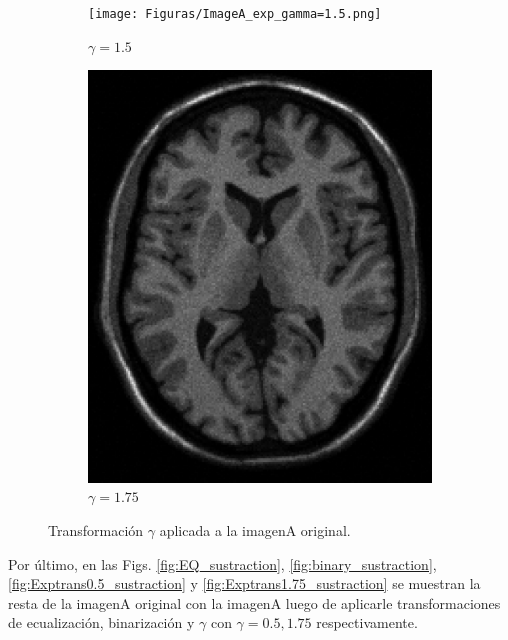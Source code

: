 \documentclass[11pt,twocolumn,twoside]{opticajnl}
\begin{document}
\begin{figure}[H]
         \begin{subfigure}[h]{0.32\linewidth}
            \centering
            \texttt{[image: Figuras/ImageA\_exp\_gamma=1.5.png]}
            \caption{$\gamma = 1.5$} 
         \end{subfigure}
         \begin{subfigure}[h]{0.32\linewidth}
            \centering
            \includegraphics[width=\textwidth]{Figuras/ImageA_exp_gamma=1.75.png}
            \caption{$\gamma = 1.75$} 
         \end{subfigure}
    \caption{Transformación $\gamma$ aplicada a la imagenA original.}
    \label{fig:Exptrans}
\end{figure}

Por último, en las Figs. \ref{fig:EQ_sustraction}, \ref{fig:binary_sustraction}, \ref{fig:Exptrans0.5_sustraction} y \ref{fig:Exptrans1.75_sustraction} se muestran la resta de la imagenA original con la imagenA luego de aplicarle transformaciones de ecualización, binarización y $\gamma$ con $\gamma = 0.5,1.75$ respectivamente.
\end{document}
